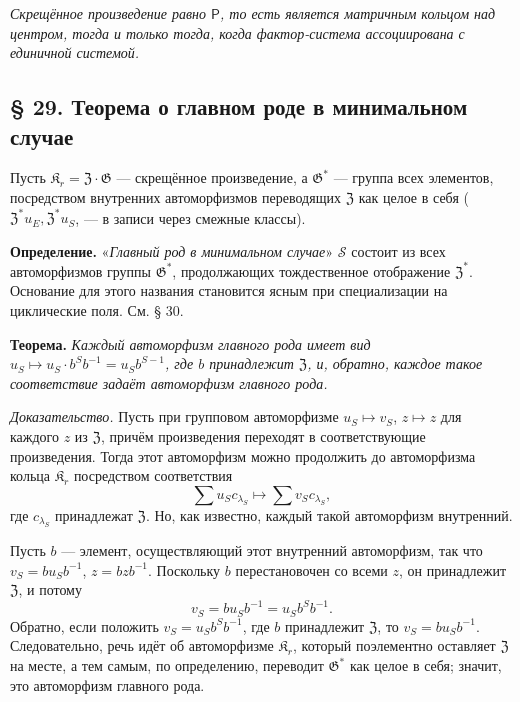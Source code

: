 \documentclass[11pt]{article}
\begin{document}
\noindent\emph{Скрещённое произведение равно \(\mathsf{P}\), то есть является матричным кольцом над центром, тогда и только тогда, когда фактор-система ассоциирована с единичной системой.}

\subsection*{§ 29. Теорема о главном роде в минимальном случае}\label{hauptgeschlechtssatz-im-minimalen}

Пусть \(\mathfrak K_r=\mathfrak Z\cdot\mathfrak G\) --- скрещённое произведение, а \(\mathfrak G^*\) --- группа всех элементов, посредством внутренних автоморфизмов переводящих \(\mathfrak Z\) как целое в себя (\(\mathfrak Z^*u_E,\mathfrak Z^*u_S\), --- в записи через смежные классы).

\noindent\textbf{Определение.} «\emph{Главный род в минимальном случае}» \(\mathscr S\) состоит из всех автоморфизмов группы \(\mathfrak G^*\), продолжающих тождественное отображение \(\mathfrak Z^*\). Основание для этого названия становится ясным при специализации на циклические поля. См. § 30.

\noindent\textbf{Теорема.} \emph{Каждый автоморфизм главного рода имеет вид \(u_S\mapsto u_S\cdot b^Sb^{-1}=u_Sb^{S-1}\), где \(b\) принадлежит \(\mathfrak Z\), и, обратно, каждое такое соответствие задаёт автоморфизм главного рода.}

\noindent\emph{Доказательство.} Пусть при групповом автоморфизме \(u_S\mapsto v_S\), \(z\mapsto z\) для каждого \(z\) из \(\mathfrak Z\), причём произведения переходят в соответствующие произведения. Тогда этот автоморфизм можно продолжить до автоморфизма кольца \(\mathfrak K_r\) посредством соответствия
\[
\sum u_Sc_{\lambda_S}\mapsto\sum v_Sc_{\lambda_S},
\]
где \(c_{\lambda_S}\) принадлежат \(\mathfrak Z\). Но, как известно, каждый такой автоморфизм внутренний.

Пусть \(b\) --- элемент, осуществляющий этот внутренний автоморфизм, так что \(v_S=bu_Sb^{-1}\), \(z=bzb^{-1}\). Поскольку \(b\) перестановочен со всеми \(z\), он принадлежит \(\mathfrak Z\), и потому
\[
v_S=bu_Sb^{-1}=u_Sb^Sb^{-1}.
\]
Обратно, если положить \(v_S=u_Sb^Sb^{-1}\), где \(b\) принадлежит \(\mathfrak Z\), то \(v_S=bu_Sb^{-1}\). Следовательно, речь идёт об автоморфизме \(\mathfrak K_r\), который поэлементно оставляет \(\mathfrak Z\) на месте, а тем самым, по определению, переводит \(\mathfrak G^*\) как целое в себя; значит, это автоморфизм главного рода.
\end{document}
